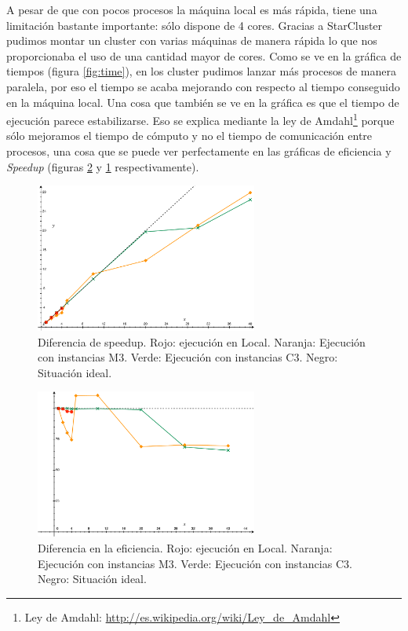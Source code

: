 \documentclass{article}
\begin{document}
	A pesar de que con pocos procesos la máquina local es más rápida, tiene una limitación bastante importante: sólo dispone de 4 cores. Gracias a StarCluster pudimos montar un cluster con varias máquinas de manera rápida lo que nos proporcionaba el uso de una cantidad mayor de cores. Como se ve en la gráfica de tiempos (figura \ref{fig:time}), en los cluster pudimos lanzar más procesos de manera paralela, por eso el tiempo se acaba mejorando con respecto al tiempo conseguido en la máquina local. Una cosa que también se ve en la gráfica es que el tiempo de ejecución parece estabilizarse. Eso se explica mediante la ley de Amdahl\footnote{Ley de Amdahl: \url{http://es.wikipedia.org/wiki/Ley_de_Amdahl}} porque sólo mejoramos el tiempo de cómputo y no el tiempo de comunicación entre procesos, una cosa que se puede ver perfectamente en las gráficas de eficiencia y \emph{Speedup} (figuras \ref{fig:eficiencia} y \ref{fig:speedup} respectivamente).


\begin{figure}[h]
  \centering
    \includegraphics[width=0.65\textwidth]{img/speedup.pdf}
  \caption{Diferencia de speedup. Rojo: ejecución en Local. Naranja: Ejecución con instancias M3. Verde: Ejecución con instancias C3. Negro: Situación ideal.}
  \label{fig:speedup}
\end{figure}

\begin{figure}[h]
  \centering
    \includegraphics[width=0.65\textwidth]{img/eficiencia.pdf}
  \caption{Diferencia en la eficiencia. Rojo: ejecución en Local. Naranja: Ejecución con instancias M3. Verde: Ejecución con instancias C3. Negro: Situación ideal.}
  \label{fig:eficiencia}
\end{figure}
\end{document}
